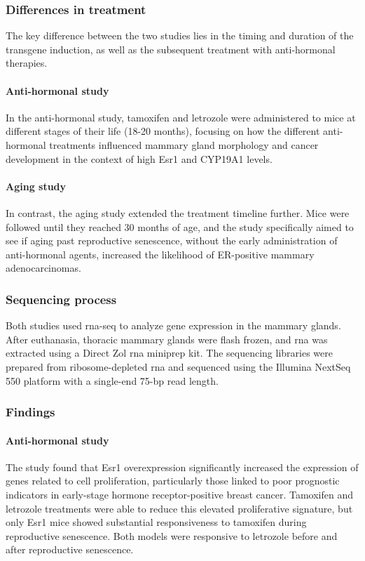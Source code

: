 \subsubsection{Differences in treatment}
The key difference between the two studies lies in the timing and duration of
the transgene induction, as well as the subsequent treatment with anti-hormonal
therapies.

\paragraph{Anti-hormonal study}
In the anti-hormonal study, tamoxifen and letrozole were administered to mice
at different stages of their life (18-20 months), focusing on how the different
anti-hormonal treatments influenced mammary gland morphology and cancer
development in the context of high Esr1 and CYP19A1
levels\supercite{furth_esr1_2023}.

\paragraph{Aging study}
In contrast, the aging study extended the treatment timeline further.
Mice were followed until they reached 30 months of age, and the study
specifically aimed to see if aging past reproductive senescence, without the
early administration of anti-hormonal agents, increased the likelihood of
ER-positive mammary adenocarcinomas\supercite{furth_overexpression_2023}.

\subsubsection{Sequencing process}
\label{sec:dataset_sequencing}
Both studies used \gls{rna-seq} to analyze gene expression in the mammary
glands.
After euthanasia, thoracic mammary glands were flash frozen, and \gls{rna} was
extracted using a Direct Zol \gls{rna} miniprep kit.
The sequencing libraries were prepared from ribosome-depleted \gls{rna} and
sequenced using the Illumina NextSeq 550 platform with a single-end 75-bp read
length\supercite{furth_esr1_2023,furth_overexpression_2023}.

\subsubsection{Findings}

\paragraph{Anti-hormonal study}
The study found that Esr1 overexpression significantly increased the expression
of genes related to cell proliferation, particularly those linked to poor
prognostic indicators in early-stage hormone receptor-positive breast cancer.
Tamoxifen and letrozole treatments were able to reduce this elevated
proliferative signature, but only Esr1 mice showed substantial responsiveness
to tamoxifen during reproductive senescence.
Both models were responsive to letrozole before and after reproductive
senescence\supercite{furth_esr1_2023}.


